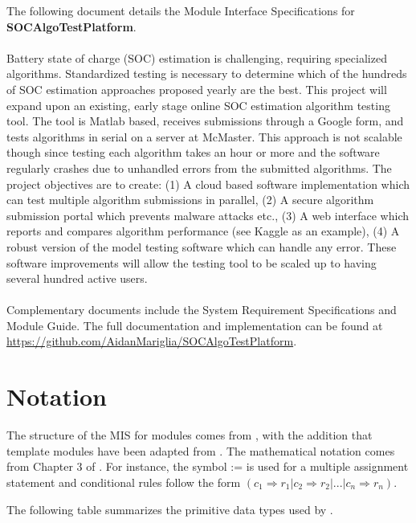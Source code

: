 \documentclass[12pt, titlepage]{article}
\begin{document}
The following document details the Module Interface Specifications for
\textbf{SOCAlgoTestPlatform}. \\\\
Battery state of charge (SOC) estimation is challenging, requiring specialized algorithms. Standardized testing is necessary to determine which of the hundreds of SOC estimation approaches proposed yearly are the best. This project will expand upon an existing, early stage online SOC estimation algorithm testing tool. The tool is Matlab based, receives submissions through a Google form, and tests algorithms in serial on a server at McMaster. This approach is not scalable though since testing each algorithm takes an hour or more and the software regularly crashes due to unhandled errors from the submitted algorithms. The project objectives are to create: (1) A cloud based software implementation which can test multiple algorithm submissions in parallel, (2) A secure algorithm submission portal which prevents malware attacks etc., (3) A web interface which reports and compares algorithm performance (see Kaggle as an example), (4) A robust version of the model testing software which can handle any error. These software improvements will allow the testing tool to be scaled up to having several hundred active users. \\\\

\noindent Complementary documents include the System Requirement Specifications
and Module Guide.  The full documentation and implementation can be
found at \url{https://github.com/AidanMariglia/SOCAlgoTestPlatform}.
\section{Notation}

The structure of the MIS for modules comes from \citet{HoffmanAndStrooper1995},
with the addition that template modules have been adapted from
\cite{GhezziEtAl2003}.  The mathematical notation comes from Chapter 3 of
\citet{HoffmanAndStrooper1995}.  For instance, the symbol := is used for a
multiple assignment statement and conditional rules follow the form $(c_1
\Rightarrow r_1 | c_2 \Rightarrow r_2 | ... | c_n \Rightarrow r_n )$.

The following table summarizes the primitive data types used by \progname. 
\end{document}
